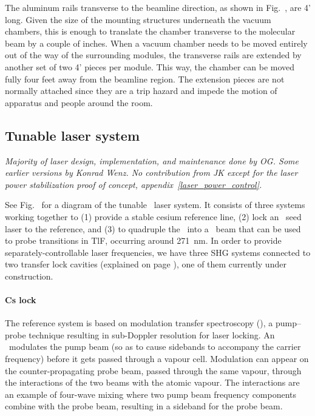 The aluminum rails transverse to the beamline direction, as shown in
Fig.~, are 4' long. Given the size of the mounting
structures underneath the vacuum chambers, this is enough to translate the
chamber transverse to the molecular beam by a couple of inches. When a vacuum
chamber needs to be moved entirely out of the way of the surrounding modules,
the transverse rails are extended by another set of two 4' pieces per module.
This way, the chamber can be moved fully four feet away from the beamline
region. The extension pieces are not normally attached since they are a trip
hazard and impede the motion of apparatus and people around the room.

\subsection{Tunable laser system}

\textit{Majority of laser design, implementation, and maintenance done by OG.
Some earlier versions by Konrad Wenz. No contribution from JK except for the
laser power stabilization proof of concept, appendix~\ref{laser_power_control}.}

See Fig.~ for a diagram of the tunable \UV\ laser system. It
consists of three systems working together to (1) provide a stable cesium
reference line, (2) lock an \IR\ seed laser to the reference, and (3) to
quadruple the \IR\ into a \UV\ beam that can be used to probe transitions in
TlF, occurring around 271~nm. In order to provide separately-controllable laser
frequencies, we have three \gls{SHG} systems connected to two
transfer lock cavities (explained on page \pageref{transfer_cavity}), one of
them currently under construction.

\paragraph{Cs lock}

The reference system is based on modulation transfer spectroscopy (\MTS), a
pump--probe technique resulting in sub-Doppler resolution for laser locking. An
\EOM\ modulates the pump beam (so as to cause sidebands to accompany the carrier
frequency) before it gets passed through a vapour cell. Modulation can appear on
the counter-propagating probe beam, passed through the same vapour, through the
interactions of the two beams with the atomic vapour. The interactions are an
example of four-wave mixing where two pump beam frequency components combine
with the probe beam, resulting in a sideband for the probe beam.
\cite{mccarron2008modulation}

